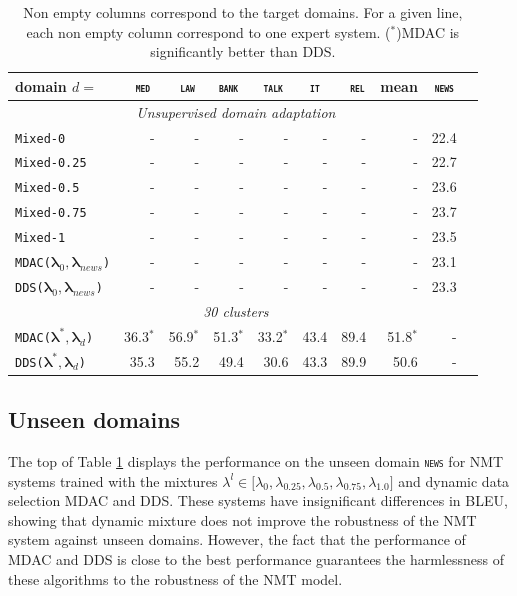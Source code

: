 \documentclass[11pt]{article}
\newcommand{\domain}[1]{\texttt{\textsc{#1}}}
\newcommand{\system}[1]{\texttt{{#1}}}
\newcommand{\vlambda}{\ensuremath{\boldsymbol\lambda}\xspace} %
\begin{document}
\begin{table}[htbp]
  \centering \small
  \begin{tabular}{|l|*9{r|}} \hline
    domain \hfill $d=$ & \multicolumn{1}{c|}{\domain{ med}} & \multicolumn{1}{c|}{\domain{ law}} & \multicolumn{1}{c|}{\domain{bank}} & \multicolumn{1}{c|}{\domain{talk}} & \multicolumn{1}{c|}{\domain{ it }} & \multicolumn{1}{c|}{\domain{ rel}} & \multicolumn{1}{c|}{mean} & \multicolumn{1}{|c|}{\domain{news}} \\ \hline \hline
    \multicolumn{9}{|c|}{\sl Unsupervised domain adaptation} \\ \hline
    \system{Mixed-0}      & - & - & - & - & - & - & - & 22.4 \\
    \system{Mixed-0.25} & - & - & - & - & - & - & - & 22.7\\
    \system{Mixed-0.5}   & - & - & - & - & - & - & - & 23.6\\
    \system{Mixed-0.75} & - & - & - & - & - & - & - & 23.7\\
    \system{Mixed-1} & - & - & - & - & - & - & - & 23.5\\
    \hline \hline
    \system{MDAC($\vlambda_0, \vlambda_{news}$)} &-&-&-&-&-&-&-&23.1 \\
     \system{DDS($\vlambda_0, \vlambda_{news}$)} &-&-&-&-&-&-&-&23.3 \\ \hline\hline 
    \multicolumn{9}{|c|}{\sl 30 clusters} \\ \hline
    \system{MDAC($\vlambda^*, \vlambda_d$)}&36.3$^*$&56.9$^*$&51.3$^*$&33.2$^*$&43.4&89.4&51.8$^*$&-\\
     \system{DDS($\vlambda^*, \vlambda_d$)}&35.3&55.2&49.4&30.6&43.3&89.9&50.6&-\\ \hline
  \end{tabular}
  \caption{Non empty columns correspond to the target domains. For a given line, each non empty column correspond to one expert system. ($^*$)MDAC is significantly better than DDS.}
  \label{tab:unsupervised-da}
\end{table}

\subsection{Unseen domains}
The top of Table \ref{tab:unsupervised-da} displays the performance on the unseen domain \domain{news} for NMT systems trained with the mixtures $\lambda^l \in \big[ \lambda_0, \lambda_{0.25}, \lambda_{0.5}, \lambda_{0.75}, \lambda_{1.0}\big]$ and dynamic data selection MDAC and DDS. These systems have insignificant differences in BLEU, showing that dynamic mixture does not improve the robustness of the NMT system against unseen domains. However, the fact that the performance of MDAC and DDS is close to the best performance guarantees the harmlessness of these algorithms to the robustness of the NMT model.
\end{document}
